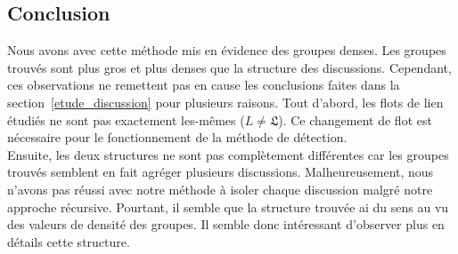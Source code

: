 \subsection{Conclusion}
Nous avons avec cette méthode mis en évidence des groupes denses.
Les groupes trouvés sont plus gros et plus denses que la structure des discussions.
Cependant, ces observations ne remettent pas en cause les conclusions faites dans la section~\ref{etude_discussion} pour plusieurs raisons.
Tout d'abord, les flots de lien étudiés ne sont pas exactement les-mêmes ($L\neq \mathfrak{L}$).
Ce changement de flot est nécessaire pour le fonctionnement de la méthode de détection.\\
Ensuite, les deux structures ne sont pas complètement différentes car les groupes trouvés semblent en fait agréger plusieurs discussions.
Malheureusement, nous n'avons pas réussi avec notre méthode à isoler chaque discussion malgré notre approche récursive.
Pourtant, il semble que la structure trouvée ai du sens au vu des valeurs de densité des groupes.
Il semble donc intéressant d'observer plus en détails cette structure.



